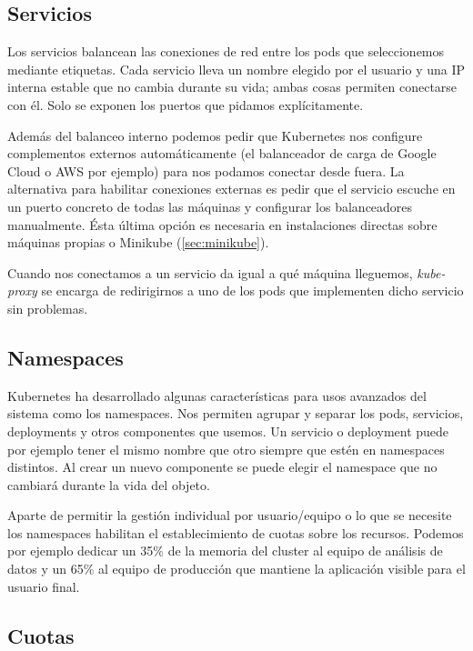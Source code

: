 \subsection{Servicios}
\label{subsec:services}

Los servicios balancean las conexiones de red entre los pods que seleccionemos mediante etiquetas. Cada servicio lleva un nombre elegido por el usuario y una IP interna estable que no cambia durante su vida; ambas cosas permiten conectarse con él. Solo se exponen los puertos que pidamos explícitamente.

Además del balanceo interno podemos pedir que Kubernetes nos configure complementos externos automáticamente (el balanceador de carga de Google Cloud o AWS por ejemplo) para nos podamos conectar desde fuera. La alternativa para habilitar conexiones externas es pedir que el servicio escuche en un puerto concreto de todas las máquinas y configurar los balanceadores manualmente. Ésta última opción es necesaria en instalaciones directas sobre máquinas propias o Minikube (\ref{sec:minikube}).

Cuando nos conectamos a un servicio da igual a qué máquina lleguemos, \emph{kube-proxy} se encarga de redirigirnos a uno de los pods que implementen dicho servicio sin problemas.

\subsection{Namespaces}
\label{subsec:namespaces}

Kubernetes ha desarrollado algunas características para usos avanzados del sistema como los namespaces. Nos permiten agrupar y separar los pods, servicios, deployments y otros componentes que usemos. Un servicio o deployment puede por ejemplo tener el mismo nombre que otro siempre que estén en namespaces distintos. Al crear un nuevo componente se puede elegir el namespace que no cambiará durante la vida del objeto.

Aparte de permitir la gestión individual por usuario/equipo o lo que se necesite los namespaces habilitan el establecimiento de cuotas sobre los recursos. Podemos por ejemplo dedicar un 35\% de la memoria del cluster al equipo de análisis de datos y un 65\% al equipo de producción que mantiene la aplicación visible para el usuario final.

\subsection{Cuotas}
\label{subsec:quotas}


